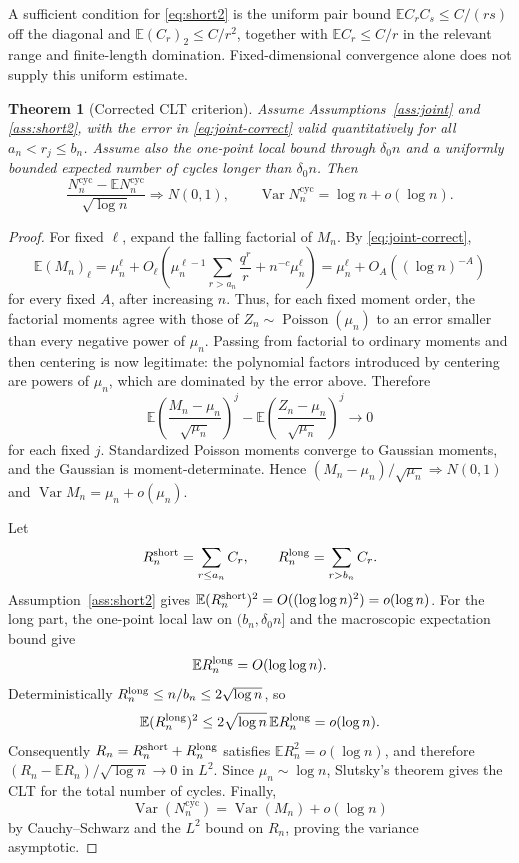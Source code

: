 \documentclass[11pt]{article}
\newcommand{\E}{\mathbb E}
\newcommand{\Var}{\operatorname{Var}}
\newcommand{\1}{\mathbf 1}
\newcommand{\Pois}{\operatorname{Poisson}}
\newcommand{\cyc}{\mathrm{cyc}}
\newtheorem{theorem}{Theorem}[section]
\theoremstyle{remark}
\begin{document}
A sufficient condition for \eqref{eq:short2} is the uniform pair bound
$\E C_rC_s\le C/(rs)$ off the diagonal and
$\E(C_r)_2\le C/r^2$, together with $\E C_r\le C/r$ in the relevant range
and finite-length domination.  Fixed-dimensional convergence alone does not
supply this uniform estimate.

\begin{theorem}[Corrected CLT criterion]\label{thm:clt-correct}
Assume Assumptions~\ref{ass:joint} and \ref{ass:short2}, with the error in
\eqref{eq:joint-correct} valid quantitatively for all
$a_n<r_j\le b_n$.  Assume also the one-point local bound through
$\delta_0n$ and a uniformly bounded expected number of cycles longer than
$\delta_0n$.  Then
\[
 \frac{N_n^{\cyc}-\E N_n^{\cyc}}{\sqrt{\log n}}
 \Longrightarrow N(0,1),
 \qquad
 \Var N_n^{\cyc}=\log n+o(\log n).
\]
\end{theorem}

\begin{proof}
For fixed $\ell$, expand the falling factorial of $M_n$.  By
\eqref{eq:joint-correct},
\[
 \E(M_n)_\ell
 =\mu_n^\ell+O_\ell\left(
   \mu_n^{\ell-1}\sum_{r>a_n}\frac{q^r}{r}
   +n^{-c}\mu_n^\ell
 \right)
 =\mu_n^\ell+O_A((\log n)^{-A})
\]
for every fixed $A$, after increasing $n$.  Thus, for each fixed moment order,
the factorial moments agree with those of $Z_n\sim\Pois(\mu_n)$ to an error
smaller than every negative power of $\mu_n$.  Passing from factorial to
ordinary moments and then centering is now legitimate: the polynomial factors
introduced by centering are powers of $\mu_n$, which are dominated by the
error above.  Therefore
\[
 \E\left(\frac{M_n-\mu_n}{\sqrt{\mu_n}}\right)^j
 -\E\left(\frac{Z_n-\mu_n}{\sqrt{\mu_n}}\right)^j\longrightarrow0
\]
for each fixed $j$.  Standardized Poisson moments converge to Gaussian
moments, and the Gaussian is moment-determinate.  Hence
$(M_n-\mu_n)/\sqrt{\mu_n}\Rightarrow N(0,1)$ and
$\Var M_n=\mu_n+o(\mu_n)$.

Let
\[
 R_n^{\rm short}=\sum_{r\le a_n}C_r,
 \qquad
 R_n^{\rm long}=\sum_{r>b_n}C_r.
\]
Assumption~\ref{ass:short2} gives
$\E(R_n^{\rm short})^2=O((\log\log n)^2)=o(\log n)$.  For the long part,
the one-point local law on $(b_n,\delta_0n]$ and the macroscopic expectation
bound give
\[
 \E R_n^{\rm long}=O(\log\log n).
\]
Deterministically $R_n^{\rm long}\le n/b_n\le2\sqrt{\log n}$, so
\[
 \E(R_n^{\rm long})^2
 \le 2\sqrt{\log n}\,\E R_n^{\rm long}
 =o(\log n).
\]
Consequently $R_n=R_n^{\rm short}+R_n^{\rm long}$ satisfies
$\E R_n^2=o(\log n)$, and therefore
$(R_n-\E R_n)/\sqrt{\log n}\to0$ in $L^2$.  Since
$\mu_n\sim\log n$, Slutsky's theorem gives the CLT for the total number of
cycles.  Finally,
\[
 \Var(N_n^{\cyc})=\Var(M_n)+o(\log n)
\]
by Cauchy--Schwarz and the $L^2$ bound on $R_n$, proving the variance
asymptotic.
\end{proof}
\end{document}
